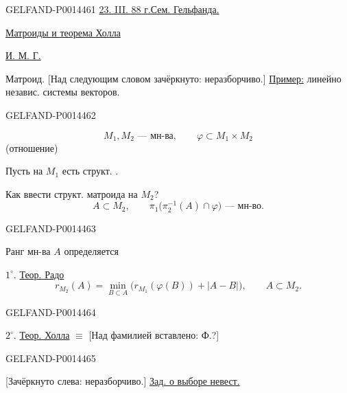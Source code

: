 \begin{GelfandAdjacentEvidence}{GELFAND-P001446}{1}
\uline{23. III. 88 г.}\qquad\uline{Сем. Гельфанда.}

\qquad\uline{Матроиды и теорема Холла}

\uline{И. М. Г.}

Матроид. [Над следующим словом зачёркнуто: неразборчиво.] \uline{Пример:} линейно независ. системы векторов.
\end{GelfandAdjacentEvidence}
\begin{GelfandAdjacentEvidence}{GELFAND-P001446}{2}

\[
M_1,M_2\text{ — мн-ва},\qquad \varphi\subset M_1\times M_2
\]
\hfill (отношение)\par

Пусть на \(M_1\) есть структ. .

Как ввести структ. матроида на \(M_2\)?
\[
A\subset M_2,\qquad
\pi_1\bigl(\pi_2^{-1}(A)\cap\varphi\bigr)\text{ — мн-во}.
\]
\end{GelfandAdjacentEvidence}
\begin{GelfandAdjacentEvidence}{GELFAND-P001446}{3}


Ранг мн-ва \(A\) определяется

\(1^\circ\). \uline{Теор. Радо}
\[
r_{M_2}(A)=\min_{B\subset A}
\bigl(r_{M_1}(\varphi(B))+|A-B|\bigr),\qquad A\subset M_2.
\]
\end{GelfandAdjacentEvidence}
\begin{GelfandAdjacentEvidence}{GELFAND-P001446}{4}


\(2^\circ\). \uline{Теор. Холла} \(\equiv\) [Над фамилией вставлено: Ф.?]
\end{GelfandAdjacentEvidence}
\begin{GelfandAdjacentEvidence}{GELFAND-P001446}{5}


[Зачёркнуто слева: неразборчиво.] \uline{Зад. о выборе невест.}
\end{GelfandAdjacentEvidence}
